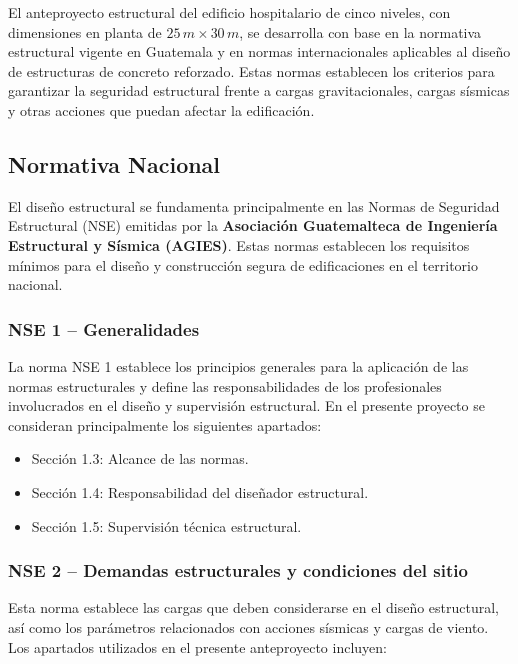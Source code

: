\documentclass[14pt,letterpaper]{extarticle}
\begin{document}
	El anteproyecto estructural del edificio hospitalario de cinco niveles, con dimensiones en planta de $25\,m \times 30\,m$, se desarrolla con base en la normativa estructural vigente en Guatemala y en normas internacionales aplicables al diseño de estructuras de concreto reforzado. Estas normas establecen los criterios para garantizar la seguridad estructural frente a cargas gravitacionales, cargas sísmicas y otras acciones que puedan afectar la edificación.
	
	\subsection{Normativa Nacional}
	
	El diseño estructural se fundamenta principalmente en las Normas de Seguridad Estructural (NSE) emitidas por la \textbf{Asociación Guatemalteca de Ingeniería Estructural y Sísmica (AGIES)}. Estas normas establecen los requisitos mínimos para el diseño y construcción segura de edificaciones en el territorio nacional.
	
	\subsubsection{NSE 1 -- Generalidades}
	
	La norma NSE 1 establece los principios generales para la aplicación de las normas estructurales y define las responsabilidades de los profesionales involucrados en el diseño y supervisión estructural. En el presente proyecto se consideran principalmente los siguientes apartados:
	
	\begin{itemize}
		\item Sección 1.3: Alcance de las normas.
		\item Sección 1.4: Responsabilidad del diseñador estructural.
		\item Sección 1.5: Supervisión técnica estructural.
	\end{itemize}
	
	\subsubsection{NSE 2 -- Demandas estructurales y condiciones del sitio}
	
	Esta norma establece las cargas que deben considerarse en el diseño estructural, así como los parámetros relacionados con acciones sísmicas y cargas de viento. Los apartados utilizados en el presente anteproyecto incluyen:
	
\end{document}
